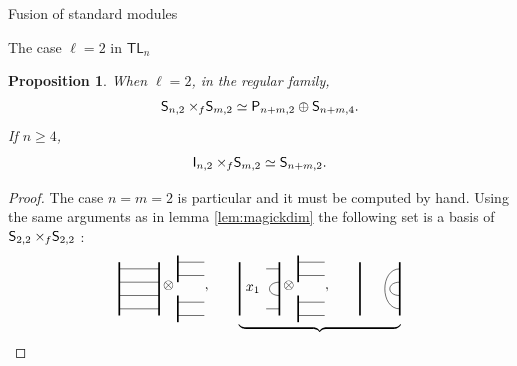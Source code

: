 \documentclass[reqno]{amsart}
\newtheorem{Prop}[Thm]{Proposition}
\newcommand{\tl}[1]{\mathsf{TL}_{#1}}
\newcommand{\ds}[1]{\mathsf S_{#1}}
\newcommand{\dl}[1]{\mathsf I_{#1}}
\newcommand{\dP}[1]{\mathsf P_{#1}}
\newcommand{\xf}{\times\hspace{-0.27em}_f}
\newcommand{\lc}{\ell}
\begin{document}
\begin{section}{Fusion of standard modules}
\begin{subsection}{The case $\lc =2$ in $\tl{n}$}
\begin{Prop}\label{prop:fusion_ds2vsds2}
When $\lc =2$, in the regular family,
\begin{equation}
\ds{n,2}\xf \ds{m,2} \simeq \dP{n+m,2} \oplus \ds{n+m,4}.
\end{equation}
If $n \geq 4$,
\begin{equation}
\dl{n,2} \xf \ds{m,2} \simeq \ds{n+m,2}.
\end{equation}
\end{Prop}
\begin{proof}
The case $n=m=2$ is particular and it must be computed by hand. Using the same arguments as in lemma \ref{lem:magickdim}  the following set is a basis of $\ds{2,2} \xf \ds{2,2}$ :
\begin{equation}
\begin{tikzpicture}[baseline={(current bounding box.center)},scale = 1/3]
%
	\draw[very thick] (0,-2) -- (0,2);
	\draw[very thick] (3,-2) -- (3,2);
	\draw (3,-3/2) -- (0,-3/2);
	\draw (3,-1/2) -- (0,-1/2);
	\draw (3,1/2) -- (0,1/2);
	\draw (3,3/2) -- (0,3/2);
%
\end{tikzpicture}
\otimes \begin{tikzpicture}[baseline={(current bounding box.center)},scale = 1/3]
	\draw[very thick] (0,-5/2) -- (0,-1/2);
	\draw[very thick] (0,1/2) -- (0,5/2);
	\draw (0,-2) -- (2,-2);
	\draw (0,-1) -- (2,-1);
	\draw (0,1) -- (2,1);
	\draw (0,2) -- (2,2);
\end{tikzpicture} ,\qquad\underbrace{
\begin{tikzpicture}[baseline={(current bounding box.center)},scale = 1/3]
%
	\draw[very thick] (0,-2) -- (0,2);
	\draw[very thick] (3,-2) -- (3,2);
	\draw (3,-3/2) -- (2,-3/2);
	\draw (3,-1/2) .. controls (2,-1/2) and (2,1/2) .. (3,1/2);
	\draw (3,3/2) -- (2,3/2);
%
	\node at (1,0) {$x_1$};
\end{tikzpicture}\otimes \begin{tikzpicture}[baseline={(current bounding box.center)},scale = 1/3]
	\draw[very thick] (0,-5/2) -- (0,-1/2);
	\draw[very thick] (0,1/2) -- (0,5/2);
	\draw (0,-2) -- (2,-2);
	\draw (0,-1) -- (2,-1);
	\draw (0,1) -- (2,1);
	\draw (0,2) -- (2,2);
\end{tikzpicture}, \qquad
\begin{tikzpicture}[baseline={(current bounding box.center)},scale = 1/3]
%
	\draw[very thick] (0,-2) -- (0,2);
	\draw[very thick] (3,-2) -- (3,2);
	\draw (3,-3/2) .. controls (3/2,-3/2) and (3/2,3/2) ..  (3,3/2);
	\draw (3,-1/2) .. controls (2,-1/2) and (2,1/2) .. (3,1/2);

\end{tikzpicture}}
\end{equation}
\end{proof}
\end{subsection}
\end{section}
\end{document}
